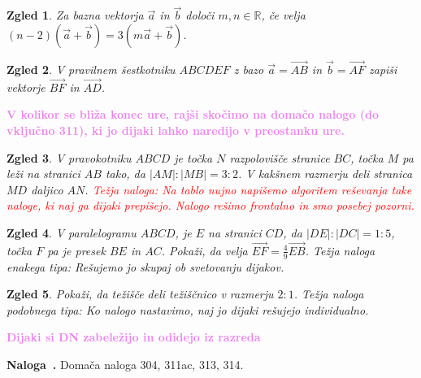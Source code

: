 \documentclass{article}
\newcounter{example}[section]
\newenvironment{example}[1][]{\refstepcounter{example}\par\medskip
   \noindent \textbf{Naloga~\theexample. #1} \rmfamily}{\medskip}
\newtheorem*{zgled}{Zgled}
\begin{document}
\begin{zgled}
    Za bazna vektorja $\vec{a}$ in $\vec{b}$ določi $m,n\in\mathbb{R}$, če velja $(n-2)(\vec{a}+\vec{b})=3(m\vec{a}+\vec{b})$.
\end{zgled}

\begin{zgled}
    V pravilnem šestkotniku $ABCDEF$ z bazo $\vec{a}=\vec{AB}$ in $\vec{b}=\vec{AF}$ zapiši vektorje $\vec{BF}$ in $\vec{AD}$.
\end{zgled}

\textbf{\textcolor{violet}{V kolikor se bliža konec ure, rajši skočimo na domačo nalogo (do vključno 311), ki jo dijaki lahko naredijo v preostanku ure.}}

\begin{zgled}
    V pravokotniku $ABCD$ je točka $N$ razpolovišče stranice $BC$, točka $M$ pa leži na stranici $AB$ tako, da $|AM|:|MB|=3:2$. V kakšnem razmerju deli stranica $MD$ daljico $AN$. \textcolor{red}{Težja naloga: Na tablo nujno napišemo algoritem reševanja take naloge, ki naj ga dijaki prepišejo. Nalogo rešimo frontalno in smo posebej pozorni.}
\end{zgled}

\begin{zgled}
    V paralelogramu $ABCD$, je $E$ na stranici $CD$, da $|DE|:|DC|=1:5$, točka $F$ pa je presek $BE$ in $AC$. Pokaži, da velja $\vec{EF}=\frac{4}{9}\vec{EB}$. {Težja naloga enakega tipa: Rešujemo jo skupaj ob svetovanju dijakov.}
\end{zgled}

\begin{zgled}
    Pokaži, da težišče deli težiščnico v razmerju $2:1$. {Težja naloga podobnega tipa: Ko nalogo nastavimo, naj jo dijaki rešujejo individualno.}
\end{zgled}

\textbf{\textcolor{violet}{Dijaki si DN zabeležijo in odidejo iz razreda}}

\begin{example}
    Domača naloga 304, 311ac, 313, 314.
\end{example}
\end{document}
